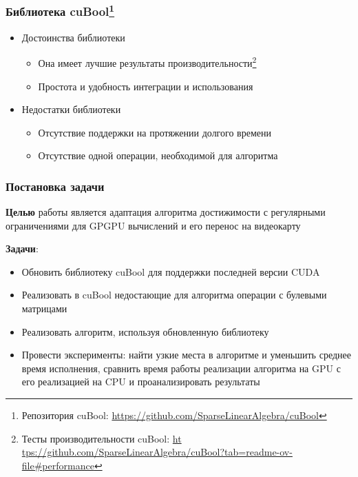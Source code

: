 \documentclass{beamer}
\begin{document}
\begin{frame}  
  \frametitle{Библиотека cuBool\footnote{Репозитория cuBool: \url{https://github.com/SparseLinearAlgebra/cuBool}}}
 
  \begin{itemize}
    \item Достоинства библиотеки
    \begin{itemize}
        \item Она имеет лучшие результаты производительности\footnote{Тесты производительности cuBool: \url{
ht  tps://github.com/SparseLinearAlgebra/cuBool?tab=readme-ov-file\#performance}}
        \item Простота и удобность интеграции и использования
    \end{itemize}
  
    \item Недостатки библиотеки
    \begin{itemize}
        \item Отсутствие поддержки на протяжении долгого времени
        \item Отсутствие одной операции, необходимой для алгоритма
    \end{itemize} 
  \end{itemize} 
\end{frame}

\begin{frame}
  \frametitle{Постановка задачи}
  \textbf{Целью} работы является адаптация алгоритма достижимости с регулярными ограничениями для GPGPU вычислений и его перенос на видеокарту

  \textbf{Задачи}:
  \begin{itemize}
      \item Обновить библиотеку cuBool для поддержки последней версии CUDA
      \item Реализовать в cuBool недостающие для алгоритма операции с булевыми матрицами
      \item Реализовать алгоритм, используя обновленную библиотеку
      \item Провести эксперименты: найти узкие места в алгоритме и уменьшить среднее время исполнения, сравнить время работы реализации алгоритма на GPU с его реализацией на CPU и проанализировать результаты
  \end{itemize}
\end{frame}
 
\end{document}
